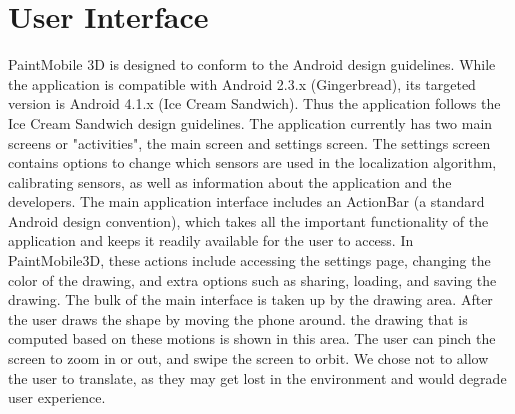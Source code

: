 \documentclass{chi-ext}
\begin{document}

\section{User Interface}

PaintMobile 3D is designed to conform to the Android design guidelines. While the application is compatible with Android 2.3.x (Gingerbread), its targeted version is Android 4.1.x (Ice Cream Sandwich). Thus the application follows the Ice Cream Sandwich design guidelines. The application currently has two main screens or "activities", the main screen and settings screen. The settings screen contains options to change which sensors are used in the localization algorithm, calibrating sensors, as well as information about the application and the developers. The main application interface includes an ActionBar (a standard Android design convention), which takes all the important functionality of the application and keeps it readily available for the user to access. In PaintMobile3D, these actions include accessing the settings page, changing the color of the drawing, and extra options such as sharing, loading, and saving the drawing. The bulk of the main interface is taken up by the drawing area. After the user draws the shape by moving the phone around. the drawing that is computed based on these motions is shown in this area. The user can pinch the screen to zoom in or out, and swipe the screen to orbit. We chose not to allow the user to translate, as they may get lost in the environment and would degrade user experience. 

\end{document}
